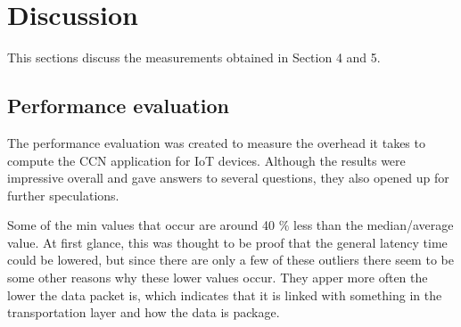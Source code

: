 \section{Discussion}
This sections discuss the measurements obtained in Section 4 and 5.

\subsection{Performance evaluation}
The performance evaluation was created to measure the overhead it takes to compute the CCN application for IoT devices. Although the results were impressive overall and gave answers to several questions, they also opened up for further speculations.

Some of the min values that occur are around 40 $\%$ less than the median/average value. At first glance, this was thought to be proof that the general latency time could be lowered, but since there are only a few of these outliers there seem to be some other reasons why these lower values occur. They apper more often the lower the data packet is, which indicates that it is linked with something in the transportation layer and how the data is package.
%

